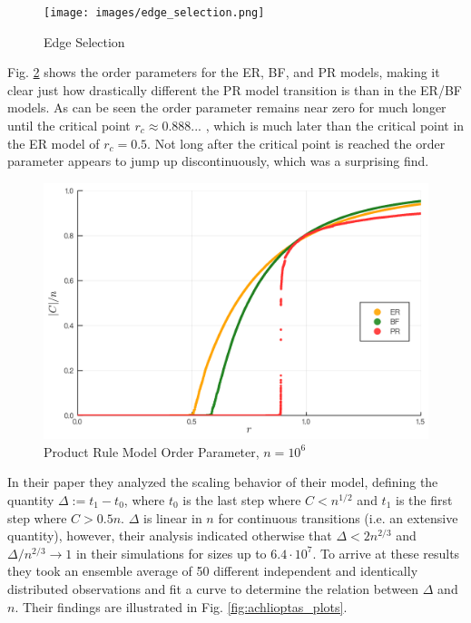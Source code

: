 \begin{figure}[H]
	\centering
	\texttt{[image: images/edge\_selection.png]}
	\caption{Edge Selection}
	\label{fig:edge_selection}
\end{figure}

Fig. \ref{fig:ER_BF_PR_transition} shows the order parameters for the ER, BF, and PR models, making it clear just how drastically different the PR model transition is than in the ER/BF models.
As can be seen the order parameter remains near zero for much longer until the critical point $r_c \approx 0.888...$ \cite{Achlioptas_1}, which is much later than the critical point in the ER model of $r_c = 0.5$.
Not long after the critical point is reached the order parameter appears to jump up discontinuously, which was a surprising find.

\begin{figure}[H]
	\centering
	\includegraphics[width=350pt]{images/Network_ER_BF_PR_1e6_order_param.png}
	\caption{Product Rule Model Order Parameter, $n = 10^6$}
	\label{fig:ER_BF_PR_transition}
\end{figure}

In their paper they analyzed the scaling behavior of their model, defining the quantity $\Delta := t_1 - t_0$, where $t_0$ is the last step where $C < n^{1/2}$ and $t_1$ is the first step where $C > 0.5n$.
$\Delta$ is linear in $n$ for continuous transitions (i.e. an extensive quantity), however, their analysis indicated otherwise that $\Delta < 2n^{2/3}$ and $\Delta / n^{2/3} \rightarrow 1$ in their simulations for sizes up to $6.4 \cdot 10^7$.
To arrive at these results they took an ensemble average of 50 different independent and identically distributed observations and fit a curve to determine the relation between $\Delta$ and $n$.
Their findings are illustrated in Fig. \ref{fig:achlioptas_plots}.
\cite{Achlioptas_1}

